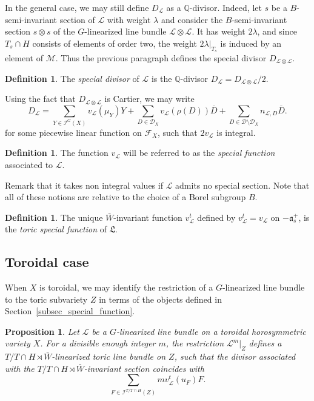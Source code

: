 \documentclass{amsart}
\newtheorem{prop}[thm]{Proposition}
\theoremstyle{definition}
\newtheorem{defn}[thm]{Definition}
\begin{document}
In the general case, we may still define $D_{\mathcal{L}}$ 
as a $\mathbb{Q}$-divisor. Indeed, let $s$ be a $B$-semi-invariant 
section of $\mathcal{L}$ with weight $\lambda$ and consider the 
$B$-semi-invariant section $s\otimes s$ of the $G$-linearized
line bundle $\mathcal{L} \otimes \mathcal{L}$. It has weight $2\lambda$, 
and since $T_s\cap H$ consists of elements of order two, the 
weight $2\lambda|_{T_s}$ is induced by an element of $\mathcal{M}$.
Thus the previous paragraph defines the special divisor 
$D_{\mathcal{L} \otimes \mathcal{L}}$.

\begin{defn}
The \emph{special divisor} of $\mathcal{L}$ is the $\mathbb{Q}$-divisor 
$D_{\mathcal{L}}=D_{\mathcal{L} \otimes \mathcal{L}}/2$.
\end{defn}

Using the fact that $D_{\mathcal{L} \otimes \mathcal{L}}$ is Cartier, 
we may write  
\[
D_{\mathcal{L}}=\sum_{Y\in \mathcal{I}^G(X)} v_{\mathcal{L}}(\mu_Y) Y 
+ \sum_{D\in \mathcal{D}_X} v_{\mathcal{L}}(\rho(D)) \overline{D} 
+\sum_{D\in \mathcal{D}\setminus \mathcal{D}_X}n_{\mathcal{L},D} \overline{D}.
\]
for some piecewise linear function on $\mathcal{F}_X$, such that 
$2v_{\mathcal{L}}$ is integral.

\begin{defn}
The function $v_{\mathcal{L}}$ will be referred to as the 
\emph{special function} associated to $\mathcal{L}$. 
\end{defn}

Remark that it takes non integral values if $\mathcal{L}$
admits no special section.
Note that all of these notions are relative to the choice of a 
Borel subgroup $B$.  

\begin{defn}
The unique $\bar{W}$-invariant function $v_{\mathcal{L}}^t$ defined 
by $v_{\mathcal{L}}^t = v_{\mathcal{L}}$ on $-\mathfrak{a}_s^+$, 
is the \emph{toric special function} of $\mathfrak{L}$.
\end{defn}

\subsection{Toroidal case}

When $X$ is toroidal, we may identify the restriction of a $G$-linearized 
line bundle to the toric subvariety $Z$ in terms of the objects defined 
in Section~\ref{subsec_special_function}. 

\begin{prop}
\label{prop_restr_tor}
Let $\mathcal{L}$ be a $G$-linearized line bundle on a toroidal horosymmetric 
variety $X$. For a divisible enough integer $m$, the restriction  
$\mathcal{L}^m|_Z$ defines a $T/T\cap H\rtimes \bar{W}$-linearized toric 
line bundle on $Z$, such that the divisor associated with the 
$T/T\cap H\rtimes \bar{W}$-invariant section coincides with 
\[
\sum_{F\in \mathcal{I}^{T/T\cap H}(Z)} mv_{\mathcal{L}}^t(u_F)F.
\]  
\end{prop}
\end{document}
